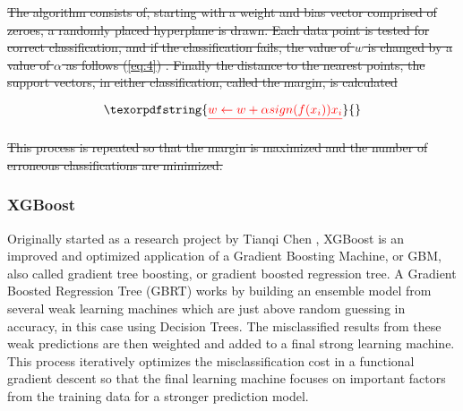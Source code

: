 \documentclass[review]{elsarticle}
\providecommand{\DIFdeltex}[1]{{\protect\color{red}\sout{#1}}}                      %
\providecommand{\DIFdelbegin}{} %
\providecommand{\DIFdelend}{} %
\providecommand{\DIFdel}[1]{\texorpdfstring{\DIFdeltex{#1}}{}} %
\newcommand{\DIFscaledelfig}{0.5}
\newlength{\DIFdelgraphicswidth} %
\newlength{\DIFdelgraphicsheight} %
\newcommand{\DIFdelincludegraphics}[2][]{%
\sbox{\DIFdelgraphicsbox}{\DIFOincludegraphics[#1]{#2}}%
\settoboxwidth{\DIFdelgraphicswidth}{\DIFdelgraphicsbox} %
\settoboxtotalheight{\DIFdelgraphicsheight}{\DIFdelgraphicsbox} %
\scalebox{\DIFscaledelfig}{%
\parbox[b]{\DIFdelgraphicswidth}{\usebox{\DIFdelgraphicsbox}\\[-\baselineskip] \rule{\DIFdelgraphicswidth}{0em}}\llap{\resizebox{\DIFdelgraphicswidth}{\DIFdelgraphicsheight}{%
\setlength{\unitlength}{\DIFdelgraphicswidth}%
\begin{picture}(1,1)%
\thicklines\linethickness{2pt} %
{\color[rgb]{1,0,0}\put(0,0){\framebox(1,1){}}}%
{\color[rgb]{1,0,0}\put(0,0){\line( 1,1){1}}}%
{\color[rgb]{1,0,0}\put(0,1){\line(1,-1){1}}}%
\end{picture}%
}\hspace*{3pt}}} %
} %
\DeclareRobustCommand{\DIFdelbegin}{\DIFOdelbegin \let\includegraphics\DIFdelincludegraphics} %
\DeclareRobustCommand{\DIFdelend}{\DIFOaddend \let\includegraphics\DIFOincludegraphics} %
\begin{document}



\DIFdel{The algorithm consists of, starting with a weight and bias vector comprised of zeroes, a randomly placed hyperplane is drawn. Each data point is tested for correct classification, and if the classification fails, the value of \(w\) is changed by a value of \(\alpha\) as follows (\ref{eq:4}) . Finally the distance to the nearest points, the support vectors, in either classification, called the margin, is calculated}\DIFdelend 

\DIFdelbegin \begin{displaymath}\DIFdel{%
w \leftarrow w + \alpha  sign(f(x_{i}))x_{i}
}\end{displaymath}
\DIFdelend 

\DIFdelbegin \DIFdel{This process is repeated so that the margin is maximized and the number of erroneous classifications are minimized. 
}\DIFdelend

\subsubsection{XGBoost}
\label{xgboost}

Originally started as a research project by Tianqi Chen \cite{xgboost}, XGBoost is an improved and optimized application of a Gradient Boosting Machine, or GBM, also called gradient tree boosting, or gradient boosted regression tree. A Gradient Boosted Regression Tree (GBRT) works by building an ensemble model from several weak learning machines which are just above random guessing in accuracy, in this case using Decision Trees. The misclassified results from these weak predictions are then weighted and added to a final strong learning machine. This process iteratively optimizes the misclassification cost in a functional gradient descent so that the final learning machine focuses on important factors from the training data for a stronger prediction model. 
\end{document}

